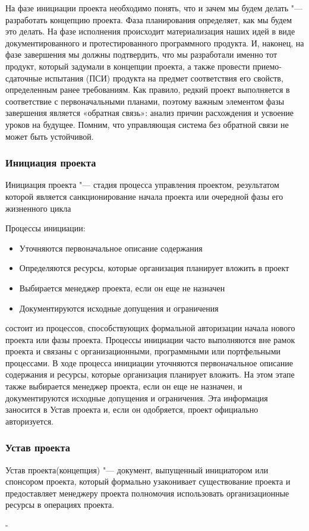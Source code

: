 \documentclass{../industrial-development}
\begin{document}
	На фазе инициации проекта необходимо понять, что и зачем мы будем делать "--- разработать концепцию проекта. Фаза планирования определяет, как мы будем это делать. На фазе исполнения происходит материализация наших идей в виде документированного и протестированного программного продукта. И, наконец, на фазе завершения мы должны подтвердить, что мы разработали именно тот продукт, который задумали в концепции проекта, а также провести приемо-сдаточные испытания (ПСИ) продукта на предмет соответствия его свойств, определенным ранее требованиям.
Как правило, редкий проект выполняется в соответствие с первоначальными планами, поэтому важным элементом фазы завершения является «обратная связь»: анализ причин расхождения и усвоение уроков на будущее. Помним, что управляющая система без обратной связи не может быть устойчивой.

    \begin{frame} \frametitle{Инициация проекта}
	\begin{definition}
		Инициация проекта "--- стадия процесса управления проектом, результатом которой является санкционирование начала проекта или очередной фазы его жизненного цикла
	\end{definition}
	Процессы инициации:

	\begin{itemize}
		\item Уточняются первоначальное описание содержания
		\item Определяются ресурсы, которые организация планирует вложить в проект
		\item Выбирается менеджер проекта, если он еще не назначен
		\item Документируются исходные допущения и ограничения
	\end{itemize}
    \end{frame}
    \lecturenotes

	состоит из процессов, способствующих формальной авторизации начала нового проекта или фазы проекта. Процессы инициации часто выполняются вне рамок проекта и связаны с организационными, программными или портфельными процессами. В ходе процесса инициации уточняются первоначальное описание содержания и ресурсы, которые организация планирует вложить. На этом этапе также выбирается менеджер проекта, если он еще не назначен, и документируются исходные допущения и ограничения. Эта информация заносится в Устав проекта и, если он одобряется, проект официально авторизуется.

    \begin{frame} \frametitle{Устав проекта}
	\begin{definition}
		Устав проекта(концепция) "--- документ, выпущенный инициатором или спонсором проекта, который формально узаконивает существование проекта и предоставляет менеджеру проекта полномочия использовать организационные ресурсы в операциях проекта. 
	\end{definition}
    \end{frame}
    \lecturenotes
-
\end{document}

